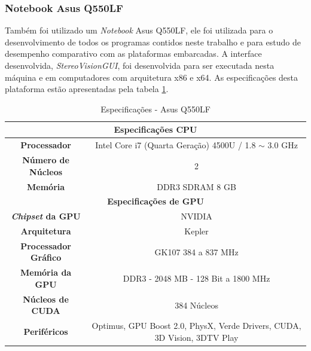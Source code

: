 \subsubsection{Notebook Asus Q550LF}

Também foi utilizado um \textit{Notebook} Asus Q550LF, ele foi utilizada para o desenvolvimento de todos os programas contidos neste trabalho e para estudo de desempenho comparativo com as plataformas embarcadas. A interface desenvolvida, \textit{StereoVisionGUI}, foi desenvolvida para ser executada nesta máquina e em computadores com arquitetura x86 e x64. As especificações desta plataforma estão apresentadas pela tabela \ref{asusQ550LF}.

\begin{table}[]
\centering
\caption{Especificações - Asus Q550LF}
\label{asusQ550LF}
\begin{tabular}{|c|c|}
\hline
\multicolumn{2}{|c|}{\textbf{Especificações CPU}}                                                      		   \\ \hline
\textbf{Processador}             	& Intel Core i7 (Quarta Geração) 4500U / 1.8 $\sim$ 3.0 GHz           	   \\ \hline
\textbf{Número de Núcleos} 		& 2  	                                                                   \\ \hline
\textbf{Memória}          		& DDR3 SDRAM 8 GB                                                          \\ \hline
\multicolumn{2}{|c|}{\textbf{Especificações de GPU}}                                                   		   \\ \hline
\textbf{\textit{Chipset} da GPU}        & NVIDIA                                                      		   \\ \hline
\textbf{Arquitetura}    		& Kepler                                                                   \\ \hline
\textbf{Processador Gráfico}            & GK107 384 a 837 MHz                                         		   \\ \hline
\textbf{Memória da GPU}          	& DDR3 - 2048 MB - 128 Bit a 1800 MHz                                      \\ \hline
\textbf{Núcleos de CUDA}      		& 384 Núcleos                                                              \\ \hline
\textbf{Periféricos}        		& Optimus, GPU Boost 2.0, PhysX, Verde Drivers, CUDA, 3D Vision, 3DTV Play \\ \hline
\end{tabular}
\end{table}


